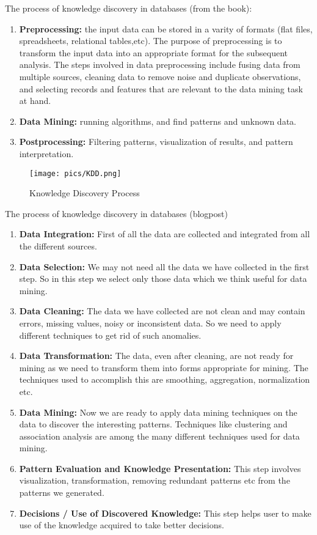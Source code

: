 	The process of knowledge discovery in databases (from the book):
	\begin{enumerate}
		\item {\bf Preprocessing:} the input data can be stored in a varity of formats (flat files, spreadsheets, relational tables,etc). The purpose of preprocessing is to transform the input data into an appropriate format for the subsequent analysis. The steps involved in data preprocessing include fusing data from multiple sources, cleaning data to remove noise and duplicate observations, and selecting records and features that are relevant to the data mining task at hand. 
		\item {\bf Data Mining:} running algorithms, and find patterns and unknown data.
		\item {\bf Postprocessing:} Filtering patterns, visualization of results, and pattern interpretation. 
	\end{enumerate}

		\begin{figure}[H]
			\texttt{[image: pics/KDD.png]}
			\caption{Knowledge Discovery Process}
		\end{figure}


	\clearpage
	The process of knowledge discovery in databases (blogpost)
		
	\begin{enumerate}
		\item {\bf Data Integration:} First of all the data are collected and integrated from all the 
		different sources.
		\item {\bf Data Selection:} We may not need all the data we have collected in the first step. So in this 
		step we select only those data which we think useful for data mining.
		\item {\bf Data Cleaning:} The data we have collected are not clean and may contain errors, missing values,
		noisy or inconsistent data. So we need to apply different techniques to get rid of such anomalies.
		\item {\bf Data Transformation:} The data, even after cleaning, are not ready for mining as we need to 
		transform them into forms appropriate for mining. The techniques used to accomplish this are smoothing,
		aggregation, normalization etc.
		\item {\bf Data Mining:} Now we are ready to apply data mining techniques on the data to discover the 
		interesting patterns. Techniques like clustering and association analysis are among the many different
		techniques used for data mining.
		\item {\bf Pattern Evaluation and Knowledge Presentation:} This step involves visualization, 
		transformation, removing redundant patterns etc from the patterns we generated.
		\item {\bf Decisions / Use of Discovered Knowledge:} This step helps user to make use of the knowledge acquired to take better decisions.
	\end{enumerate}

